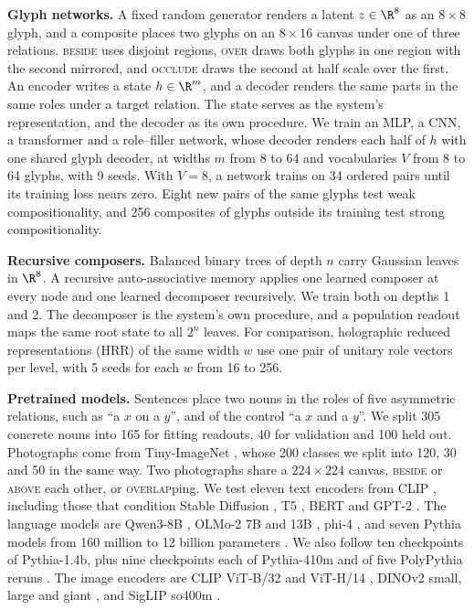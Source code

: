 \textbf{Glyph networks.} A fixed random generator renders a latent $z \in \R^{8}$ as an $8 \times 8$ glyph, and a composite places two glyphs on an $8 \times 16$ canvas under one of three relations. \textsc{beside} uses disjoint regions, \textsc{over} draws both glyphs in one region with the second mirrored, and \textsc{occlude} draws the second at half scale over the first. An encoder writes a state $h \in \R^m$, and a decoder renders the same parts in the same roles under a target relation. The state serves as the system's representation, and the decoder as its own procedure. We train an MLP, a CNN, a transformer and a role--filler network, whose decoder renders each half of $h$ with one shared glyph decoder, at widths $m$ from 8 to 64 and vocabularies $V$ from 8 to 64 glyphs, with 9 seeds. With $V = 8$, a network trains on 34 ordered pairs until its training loss nears zero. Eight new pairs of the same glyphs test weak compositionality, and 256 composites of glyphs outside its training test strong compositionality.

\textbf{Recursive composers.} Balanced binary trees of depth $n$ carry Gaussian leaves in $\R^8$. A recursive auto-associative memory \citep{pollack1990} applies one learned composer at every node and one learned decomposer recursively. We train both on depths 1 and 2. The decomposer is the system's own procedure, and a population readout maps the same root state to all $2^n$ leaves. For comparison, holographic reduced representations (HRR) of the same width $w$ use one pair of unitary role vectors per level, with 5 seeds for each $w$ from 16 to 256.

\textbf{Pretrained models.} Sentences place two nouns in the roles of five asymmetric relations, such as ``a $x$ on a $y$'', and of the control ``a $x$ and a $y$''. We split 305 concrete nouns into 165 for fitting readouts, 40 for validation and 100 held out. Photographs come from Tiny-ImageNet \citep{le2015tiny}, whose 200 classes we split into 120, 30 and 50 in the same way. Two photographs share a $224 \times 224$ canvas, \textsc{beside} or \textsc{above} each other, or \textsc{overlap}ping. We test eleven text encoders from CLIP \citep{radford2021clip}, including those that condition Stable Diffusion \citep{rombach2022}, T5 \citep{raffel2020t5}, BERT \citep{devlin2019bert} and GPT-2 \citep{radford2019gpt2}. The language models are Qwen3-8B \citep{yang2025qwen3}, OLMo-2 7B and 13B \citep{olmo2024olmo2}, phi-4 \citep{abdin2024phi4}, and seven Pythia models from 160 million to 12 billion parameters \citep{biderman2023pythia}. We also follow ten checkpoints of Pythia-1.4b, plus nine checkpoints each of Pythia-410m and of five PolyPythia reruns \citep{vanderwal2025polypythias}. The image encoders are CLIP ViT-B/32 and ViT-H/14 \citep{radford2021clip,cherti2023}, DINOv2 small, large and giant \citep{oquab2024dinov2}, and SigLIP so400m \citep{zhai2023siglip}.

